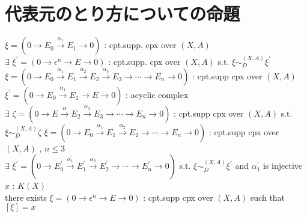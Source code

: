 \documentclass[dvipdfmx]{jsarticle}
\begin{document}
\section*{代表元のとり方についての命題}
\begin{Theorem}[複体と代表元]
\itemprop
  \For \(\xi = (0 \to E_0 \overset{\alpha_1}{\to} E_1 \to 0)\) : cpt.supp. cpx over \((X,A)\) \\
  \Then \(\exists\) \(\xi^\prime = (0 \to \epsilon^n \to E \to 0)\) : cpt.supp. cpx over \((X,A)\) s.t. \(\xi \sim_{D}^{(X,A)} \xi^\prime\)
\itemprop
  \For \(\xi = (0 \to E_0 \overset{\alpha_1}{\to} E_1 \overset{\alpha_2}{\to} E_2 \overset{\alpha_3}{\to} E_3 \to \cdots \to E_n \to 0)\) : cpt.supp cpx over \((X,A)\) \\
  \For \(\xi^\prime = (0 \to E_0 \overset{\alpha_1}{\to} E_1 \to E \to 0)\) : acyclic complex \\
  \Then \(\exists\) \(\zeta = (0 \to E \overset{\alpha}{\to} E_2 \overset{\alpha_3}{\to} E_3 \to \cdots \to E_n \to 0)\) : cpt.supp cpx over \((X,A)\) s.t. \(\xi \sim_{D}^{(X,A)} \zeta\)
\itemprop
  \For \(\xi = (0 \to E_0 \overset{\alpha_1}{\to} E_1 \overset{\alpha_2}{\to} E_2 \to \cdots \to E_n \to 0)\) : cpt.supp cpx over \((X,A)\) , \(n \leq 3\) \\
  \Then \(\exists\) \(\xi^\prime = (0 \to E^\prime_0 \overset{\alpha^\prime_1}{\to} E^\prime_1 \overset{\alpha^\prime_2}{\to} E^\prime_2 \to \cdots \to E^\prime_n \to 0)\) s.t. \(\xi \sim_{D}^{(X,A)} \xi^\prime\) and \(\alpha^\prime_1\) is injective
\itemprop
  \For \(x\) : \(K(X)\) \\
  \Then there exists \(\xi = (0 \to \epsilon^n \to E \to 0)\) : cpt.supp cpx over \((X,A)\) such that \([\xi] = x\)
\end{Theorem}

\newpage
\end{document}
